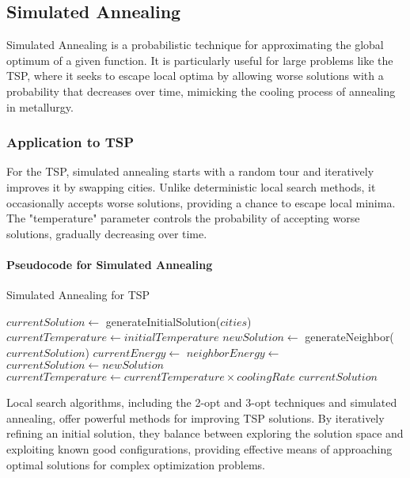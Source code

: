 \subsection{Simulated Annealing}

Simulated Annealing is a probabilistic technique for approximating the global optimum of a given function. It is particularly useful for large problems like the TSP, where it seeks to escape local optima by allowing worse solutions with a probability that decreases over time, mimicking the cooling process of annealing in metallurgy.

\subsubsection{Application to TSP}

For the TSP, simulated annealing starts with a random tour and iteratively improves it by swapping cities. Unlike deterministic local search methods, it occasionally accepts worse solutions, providing a chance to escape local minima. The "temperature" parameter controls the probability of accepting worse solutions, gradually decreasing over time.

\paragraph{Pseudocode for Simulated Annealing}

\begin{algorithm}
	\caption{Simulated Annealing for TSP}\label{alg:simulatedannealing}
	\begin{algorithmic}[1]
		\State $currentSolution \gets$ generateInitialSolution($cities$)
		\State $currentTemperature \gets initialTemperature$
		\State $newSolution \gets$ generateNeighbor($currentSolution$)
		\State $currentEnergy \gets$ 
		\State $neighborEnergy \gets$ 
		\State $currentSolution \gets newSolution$
		\EndIf
		\State $currentTemperature \gets currentTemperature \times coolingRate$
		\EndWhile
		\State \Return $currentSolution$
		\EndProcedure
	\end{algorithmic}
\end{algorithm}

Local search algorithms, including the 2-opt and 3-opt techniques and simulated annealing, offer powerful methods for improving TSP solutions. By iteratively refining an initial solution, they balance between exploring the solution space and exploiting known good configurations, providing effective means of approaching optimal solutions for complex optimization problems.
